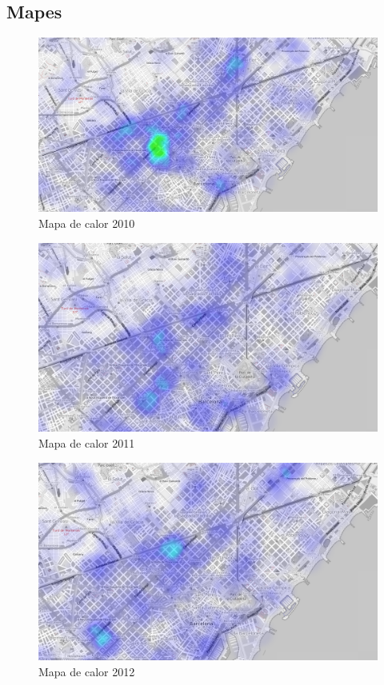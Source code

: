 \subsection*{Mapes}
\begin{figure}
    \includegraphics[width=\textwidth,height=\textheight,keepaspectratio]{mapesImg/heatmap2010.png}
    \caption{Mapa de calor 2010}
    \label{fig:heatmap0}
\end{figure}
\begin{figure}
    \includegraphics[width=\textwidth,height=\textheight,keepaspectratio]{mapesImg/heatmap2011.png}
    \caption{Mapa de calor 2011}
    \label{fig:heatmap1}
\end{figure}

\begin{figure}
    \includegraphics[width=\textwidth,height=\textheight,keepaspectratio]{mapesImg/heatmap2012.png}
    \caption{Mapa de calor 2012}
    \label{fig:heatmap2}
\end{figure}


